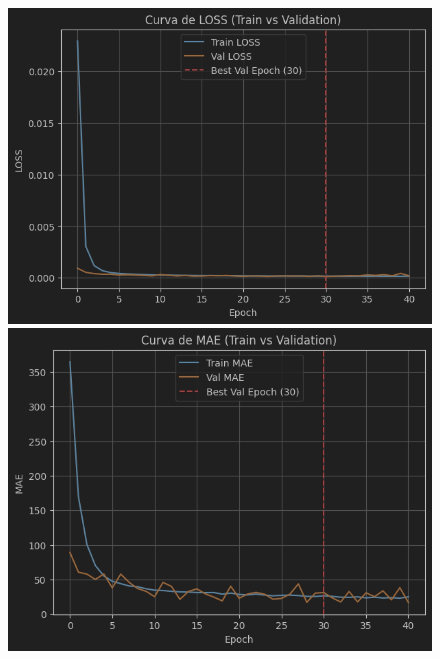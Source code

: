 \begin{figure}[H]
	\centering
	\begin{minipage}{0.48\textwidth}
		\centering
		\includegraphics[width=\linewidth]{includes/cap5/graphs/sid2_mlp_loss.png}
		\vspace{0.2cm}
		\includegraphics[width=\linewidth]{includes/cap5/graphs/sid2_mlp_mae.png}
		\vspace{0.2cm}

\end{minipage}
\end{figure}

